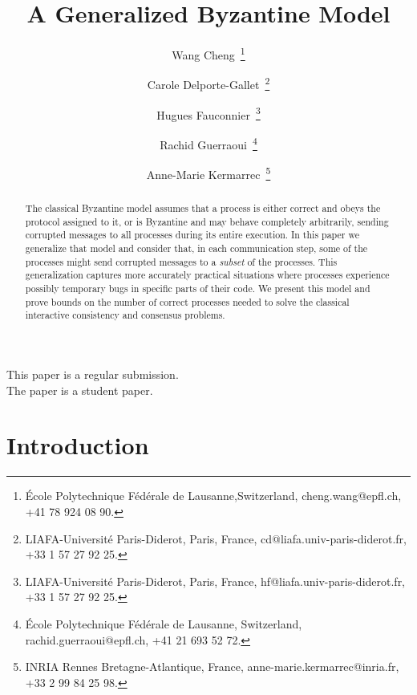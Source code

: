 \documentclass[11pt,letterpaper]{article}
\newcommand{\tmem}[1]{{\em #1\/}}
\begin{document}
\title{A Generalized Byzantine Model}

\author{
    Wang Cheng~\protect\footnote{\'{E}cole Polytechnique F\'{e}d\'{e}rale de Lausanne,Switzerland, cheng.wang@epfl.ch, +41 78 924 08 90.}
    \and
    Carole Delporte-Gallet~\protect\footnote{LIAFA-Universit\'{e} Paris-Diderot, Paris, France, cd@liafa.univ-paris-diderot.fr, +33 1 57 27 92 25.}
    \and
    Hugues Fauconnier~\protect\footnote{LIAFA-Universit\'{e} Paris-Diderot, Paris, France, hf@liafa.univ-paris-diderot.fr, +33 1 57 27 92 25.}
    \and
    Rachid Guerraoui~\protect\footnote{\'{E}cole Polytechnique F\'{e}d\'{e}rale de Lausanne, Switzerland, rachid.guerraoui@epfl.ch, +41 21 693 52 72.}
    \and
    Anne-Marie Kermarrec~\protect\footnote{INRIA Rennes Bretagne-Atlantique, France, anne-marie.kermarrec@inria.fr, +33 2 99 84 25 98.}
}
\date{}

\maketitle

\begin{abstract}

The classical Byzantine model assumes that a process is either correct and obeys the protocol assigned to it, or is Byzantine and may  behave completely arbitrarily, sending corrupted messages to all processes during its entire execution. In this paper we generalize that model and consider that, in each communication step, some of the processes might send corrupted messages to a \tmem{subset} of the processes. This generalization captures more accurately  practical situations where
processes experience possibly temporary bugs in specific parts of their code. We present this model and prove bounds on the number of correct processes needed to solve the classical interactive consistency and consensus problems.

\end{abstract}

\vspace{4cm}
\begin{center}
\Large This paper is a regular submission.\\
\Large The paper is a student paper.
\end{center}

\newpage
{}\setcounter{page}{1}

\section{Introduction}
\end{document}
